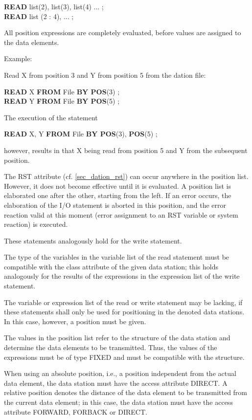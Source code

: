 {\bf READ} list(2), list(3), list(4) ... ;\\
{\bf READ} list (2 : 4), ... ;

All position expressions are completely evaluated, before values are
assigned to the data elements.

Example:

Read X from position 3 and Y from position 5 from the dation file:

{\bf READ} X {\bf FROM} File {\bf BY POS}(3) ;\\
{\bf READ} Y {\bf FROM} File {\bf BY POS}(5) ;

The execution of the statement

{\bf READ} X, Y {\bf FROM} File {\bf BY POS}(3), {\bf POS}(5) ;

however, results in that X being read from position 5 and Y from the
subsequent position.

The RST attribute (cf. \ref{sec_dation_rst}) can occur anywhere in the
 position list.
However, it does not become effective until it is evaluated. A position
list is elaborated one after the other, starting from the left. If an
error occurs, the elaboration of the I/O statement is aborted in this
position, and the error reaction valid at this moment (error assignment
to an RST variable or system reaction) is executed.

These statements analogously hold for the write statement.

The type of the variables in the variable list of the read statement
must be compatible with the class attribute of the given data station;
this holds analogously for the results of the expressions in the
expression list of the write statement.

The variable or expression list of the read or write statement may be
lacking, if these statements shall only be used for positioning in the
denoted data stations. In this case, however, a position must be
given.

The values in the position list refer to the structure of the data
station and determine the data elements to be transmitted. Thus, the
values of the expressions must be of type FIXED and must be compatible
with the structure.

When using an absolute position, i.e., a position independent from the
actual data element, the data station must have the access attribute
DIRECT. A relative position denotes the distance of the data element to
be transmitted from the current data element; in this case, the data
station must have the access attribute FORWARD, FORBACK or DIRECT.

